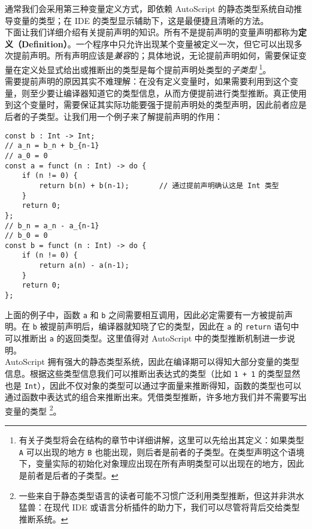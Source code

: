 通常我们会采用第三种变量定义方式，即依赖 AutoScript 的静态类型系统自动推导变量的类型；在 IDE 的类型显示辅助下，这是最便捷且清晰的方法。 \\

下面让我们详细介绍有关提前声明的知识。所有不是提前声明的变量声明都称为\textbf{定义（Definition）}。一个程序中只允许出现某个变量被定义一次，但它可以出现多次提前声明。所有声明应该是\emph{兼容}的；具体地说，无论提前声明如何，需要保证变量在定义处显式给出或推断出的类型是每个提前声明处类型的\emph{子类型} \footnote{有关子类型将会在结构的章节中详细讲解，这里可以先给出其定义：如果类型 \lstinline!A! 可以出现的地方 \lstinline!B! 也能出现，则后者是前者的子类型。在类型声明这个语境下，变量实际的初始化对象理应出现在所有声明类型可以出现在的地方，因此是前者是后者的子类型。}。 \\

需要提前声明的原因其实不难理解：在没有定义变量时，如果需要利用到这个变量，则至少要让编译器知道它的类型信息，从而方便提前进行类型推断。真正使用到这个变量时，需要保证其实际功能要强于提前声明处的类型声明，因此前者应是后者的子类型。让我们用一个例子来了解提前声明的作用：

\pagebreak

\begin{lstlisting}
const b : Int -> Int;
// a_n = b_n + b_{n-1}
// a_0 = 0
const a = funct (n : Int) -> do {
    if (n != 0) {
        return b(n) + b(n-1);		// 通过提前声明确认这是 Int 类型
    }
    return 0;
};
// b_n = a_n - a_{n-1}
// b_0 = 0
const b = funct (n : Int) -> do {
    if (n != 0) {
        return a(n) - a(n-1);
    }
    return 0;
};
\end{lstlisting}

上面的例子中，函数 \lstinline!a! 和 \lstinline!b! 之间需要相互调用，因此必定需要有一方被提前声明。在 \lstinline!b! 被提前声明后，编译器就知晓了它的类型，因此在 \lstinline!a! 的 \lstinline!return! 语句中可以推断出 \lstinline!a! 的返回类型。这里值得对 AutoScript 中的类型推断机制进一步说明。 \\

AutoScript 拥有强大的静态类型系统，因此在编译期可以得知大部分变量的类型信息。根据这些类型信息我们可以推断出表达式的类型（比如 \lstinline!1 + 1! 的类型显然也是 \lstinline!Int!），因此不仅对象的类型可以通过字面量来推断得知，函数的类型也可以通过函数中表达式的组合来推断出来。凭借类型推断，许多地方我们并不需要写出变量的类型 \footnote{一些来自于静态类型语言的读者可能不习惯广泛利用类型推断，但这并非洪水猛兽：在现代 IDE 或语言分析插件的助力下，我们可以尽管将背后交给类型推断系统。}。


